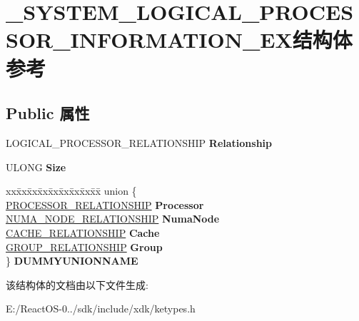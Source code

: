 \hypertarget{struct___s_y_s_t_e_m___l_o_g_i_c_a_l___p_r_o_c_e_s_s_o_r___i_n_f_o_r_m_a_t_i_o_n___e_x}{}\section{\+\_\+\+S\+Y\+S\+T\+E\+M\+\_\+\+L\+O\+G\+I\+C\+A\+L\+\_\+\+P\+R\+O\+C\+E\+S\+S\+O\+R\+\_\+\+I\+N\+F\+O\+R\+M\+A\+T\+I\+O\+N\+\_\+\+E\+X结构体 参考}
\label{struct___s_y_s_t_e_m___l_o_g_i_c_a_l___p_r_o_c_e_s_s_o_r___i_n_f_o_r_m_a_t_i_o_n___e_x}
\subsection*{Public 属性}
\begin{DoxyCompactItemize}
\item 
\mbox{\label{struct___s_y_s_t_e_m___l_o_g_i_c_a_l___p_r_o_c_e_s_s_o_r___i_n_f_o_r_m_a_t_i_o_n___e_x_ab8564b476da492111690face992a8e4b}} 
L\+O\+G\+I\+C\+A\+L\+\_\+\+P\+R\+O\+C\+E\+S\+S\+O\+R\+\_\+\+R\+E\+L\+A\+T\+I\+O\+N\+S\+H\+IP {\bfseries Relationship}
\item 
\mbox{\label{struct___s_y_s_t_e_m___l_o_g_i_c_a_l___p_r_o_c_e_s_s_o_r___i_n_f_o_r_m_a_t_i_o_n___e_x_ab637bcb88eba2e011297e06d1a94072a}} 
U\+L\+O\+NG {\bfseries Size}
\item 
\mbox{\label{struct___s_y_s_t_e_m___l_o_g_i_c_a_l___p_r_o_c_e_s_s_o_r___i_n_f_o_r_m_a_t_i_o_n___e_x_a92a7505ee07fd56b25d622bdf05a204d}} 
\begin{tabbing}
xx\=xx\=xx\=xx\=xx\=xx\=xx\=xx\=xx\=\kill
union \{\\
\>\hyperlink{struct___p_r_o_c_e_s_s_o_r___r_e_l_a_t_i_o_n_s_h_i_p}{PROCESSOR\_RELATIONSHIP} {\bfseries Processor}\\
\>\hyperlink{struct___n_u_m_a___n_o_d_e___r_e_l_a_t_i_o_n_s_h_i_p}{NUMA\_NODE\_RELATIONSHIP} {\bfseries NumaNode}\\
\>\hyperlink{struct___c_a_c_h_e___r_e_l_a_t_i_o_n_s_h_i_p}{CACHE\_RELATIONSHIP} {\bfseries Cache}\\
\>\hyperlink{struct___g_r_o_u_p___r_e_l_a_t_i_o_n_s_h_i_p}{GROUP\_RELATIONSHIP} {\bfseries Group}\\
\} {\bfseries DUMMYUNIONNAME}\\

\end{tabbing}\end{DoxyCompactItemize}


该结构体的文档由以下文件生成\+:\begin{DoxyCompactItemize}
\item 
E\+:/\+React\+O\+S-\/0../sdk/include/xdk/ketypes.\+h\end{DoxyCompactItemize}
